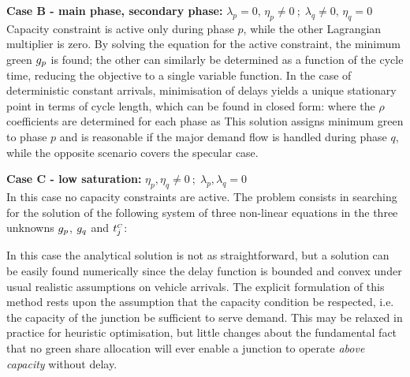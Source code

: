 \textbf{Case B - main phase, secondary phase:} $\lambda_p = 0,\, \eta_p \neq 0 \: ; \; \lambda_q \neq 0,\, \eta_q = 0$\\
Capacity constraint is active only during phase $p$, while the other Lagrangian multiplier is zero. By solving the equation for the active constraint, the minimum green $g_{p}$ is found; the other can similarly be determined as a function of the cycle time, reducing the objective to a single variable function.
In the case of deterministic constant arrivals, minimisation of delays yields a unique stationary point in terms of cycle length, which can be found in closed form:
where the $\rho$ coefficients are determined for each phase as
This solution assigns minimum green to phase $p$ and is reasonable if the major demand
flow is handled during phase $q$, while the opposite scenario covers the specular case.

\textbf{Case C - low saturation:} $\eta_p, \eta_q \neq 0 \: ; \; \lambda_p,\lambda_q = 0$\\
In this case no capacity constraints are active. The problem consists in searching for
the solution of the following system of three non-linear equations in the three unknowns $g_{p}$, $g_{q}$ and $t_{j}^{\scriptscriptstyle{C}}$:

In this case the analytical solution is not as straightforward, but a solution can be easily found numerically since the delay function is bounded and convex under usual realistic assumptions on vehicle arrivals.
The explicit formulation of this method rests upon the assumption that the capacity
condition be respected, i.e. the capacity of the junction be sufficient to serve demand. This
may be relaxed in practice for heuristic optimisation, but little changes about the fundamental
fact that no green share allocation will ever enable a junction to operate \emph{above capacity}
without delay.


